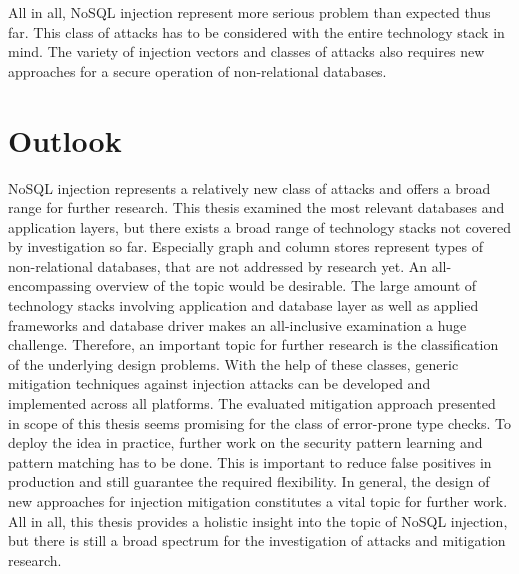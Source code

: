 All in all, NoSQL injection represent more serious problem than expected thus far. This class of attacks has to be considered with the entire technology stack in mind. The variety of injection vectors and classes of attacks also requires new approaches for a secure operation of non-relational databases. 

\section{Outlook}
NoSQL injection represents a relatively new class of attacks and offers a broad range for further research. This thesis examined the most relevant databases and application layers, but there exists a broad range of technology stacks not covered by investigation so far. Especially graph and column stores represent types of non-relational databases, that are not addressed by research yet. An all-encompassing overview of the topic would be desirable. The large amount of technology stacks involving application and database layer as well as applied frameworks and database driver makes an all-inclusive examination a huge challenge. Therefore, an important topic for further research is the classification of the underlying design problems. With the help of these classes, generic mitigation techniques against injection attacks can be developed and implemented across all platforms. The evaluated mitigation approach presented in scope of this thesis seems promising for the class of error-prone type checks. To deploy the idea in practice, further work on the security pattern learning and pattern matching has to be done. This is important to reduce false positives in production and still guarantee the required flexibility. In general, the design of new approaches for injection mitigation constitutes a vital topic for further work. All in all, this thesis provides a holistic insight into the topic of NoSQL injection, but there is still a broad spectrum for the investigation of attacks and mitigation research. 